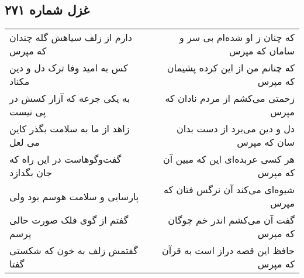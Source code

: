 \begin{center}
\section*{غزل شماره ۲۷۱}
\label{sec:sh271}
\begin{longtable}{l p{0.5cm} r}
دارم از زلف سیاهش گله چندان که مپرس
&&
که چنان ز او شده‌ام بی سر و سامان که مپرس
\\
کس به امید وفا ترک دل و دین مکناد
&&
که چنانم من از این کرده پشیمان که مپرس
\\
به یکی جرعه که آزار کسش در پی نیست
&&
زحمتی می‌کشم از مردم نادان که مپرس
\\
زاهد از ما به سلامت بگذر کاین می لعل
&&
دل و دین می‌برد از دست بدان سان که مپرس
\\
گفت‌وگوهاست در این راه که جان بگدازد
&&
هر کسی عربده‌ای این که مبین آن که مپرس
\\
پارسایی و سلامت هوسم بود ولی
&&
شیوه‌ای می‌کند آن نرگس فتان که مپرس
\\
گفتم از گوی فلک صورت حالی پرسم
&&
گفت آن می‌کشم اندر خم چوگان که مپرس
\\
گفتمش زلف به خون که شکستی گفتا
&&
حافظ این قصه دراز است به قرآن که مپرس
\\
\end{longtable}
\end{center}
